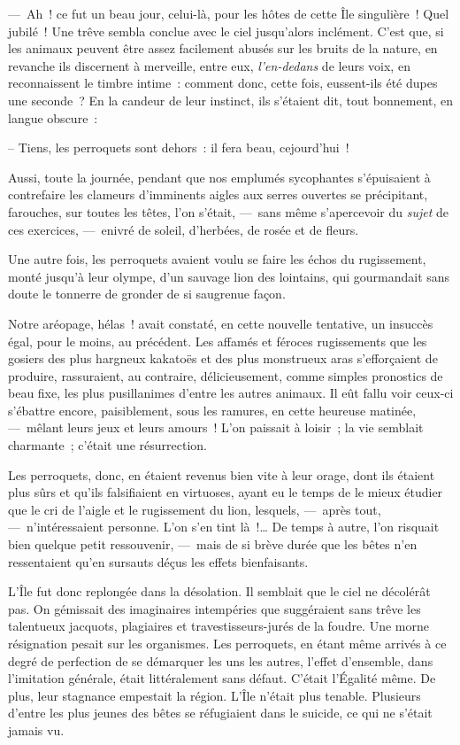 \documentclass[french,twoside]{book} %
\begin{document}
— Ah ! ce fut un beau jour, celui-là, pour les hôtes de cette Île singulière ! Quel jubilé ! Une trêve sembla conclue avec le ciel jusqu’alors inclément. C’est que, si les animaux peuvent être assez facilement abusés sur les bruits de la nature, en revanche ils discernent à merveille, entre eux, \emph{l’en-dedans} de leurs voix, en reconnaissent le timbre intime : comment donc, cette fois, eussent-ils été dupes une seconde ? En la candeur de leur instinct, ils s’étaient dit, tout bonnement, en langue obscure :\par
   – Tiens, les perroquets sont dehors : il fera beau, cejourd’hui !\par
Aussi, toute la journée, pendant que nos emplumés sycophantes s’épuisaient à contrefaire les clameurs d’imminents aigles aux serres ouvertes se précipitant, farouches, sur toutes les têtes, l’on s’était, — sans même s’apercevoir du \emph{sujet} de ces exercices, — enivré de soleil, d’herbées, de rosée et de fleurs.\par
Une autre fois, les perroquets avaient voulu se faire les échos du rugissement, monté jusqu’à leur olympe, d’un sauvage lion des lointains, qui gourmandait sans doute le tonnerre de gronder de si saugrenue façon.\par
Notre aréopage, hélas ! avait constaté, en cette nouvelle tentative, un insuccès égal, pour le moins, au précédent. Les affamés et féroces rugissements que les gosiers des plus hargneux kakatoës et des plus monstrueux aras s’efforçaient de produire, rassuraient, au contraire, délicieusement, comme simples pronostics de beau fixe, les plus pusillanimes d’entre les autres animaux. Il eût fallu voir ceux-ci s’ébattre   encore, paisiblement, sous les ramures, en cette heureuse matinée, — mêlant leurs jeux et leurs amours ! L’on paissait à loisir ; la vie semblait charmante ; c’était une résurrection.\par
Les perroquets, donc, en étaient revenus bien vite à leur orage, dont ils étaient plus sûrs et qu’ils falsifiaient en virtuoses, ayant eu le temps de le mieux étudier que le cri de l’aigle et le rugissement du lion, lesquels, — après tout, — n’intéressaient personne. L’on s’en tint là !… De temps à autre, l’on risquait bien quelque petit ressouvenir, — mais de si brève durée que les bêtes n’en ressentaient qu’en sursauts déçus les effets bienfaisants.\par
L’Île fut donc replongée dans la désolation. Il semblait que le ciel ne décolérât pas. On gémissait des imaginaires intempéries que suggéraient sans trêve les talentueux jacquots, plagiaires et travestisseurs-jurés de la foudre. Une morne résignation pesait sur les organismes. Les perroquets, en étant même arrivés à ce degré de perfection de se démarquer les uns les autres, l’effet d’ensemble, dans l’imitation générale,   était littéralement sans défaut. C’était l’Égalité même. De plus, leur stagnance empestait la région. L’Île n’était plus tenable. Plusieurs d’entre les plus jeunes des bêtes se réfugiaient dans le suicide, ce qui ne s’était jamais vu.\par
\end{document}
